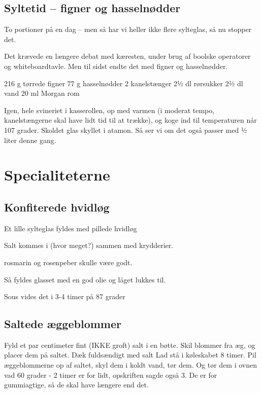 \documentclass[
  letterpaper,
  DIV=11,
  numbers=noendperiod]{scrreprt}
\begin{document}
\hypertarget{syltetid-figner-og-hasselnuxf8dder}{%
\section{Syltetid -- figner og
hasselnødder}\label{syltetid-figner-og-hasselnuxf8dder}}

To portioner på en dag -- men så har vi heller ikke flere sylteglas, så
nu stopper det.

Det krævede en længere debat med kæresten, under brug af boolske
operatorer og whiteboardtavle. Men til sidst endte det med figner og
hasselnødder.

216 g tørrede figner 77 g hasselnødder 2 kanelstænger 2½ dl rørsukker 2½
dl vand 20 ml Morgan rom

Igen, hele svineriet i kasserollen, op med varmen (i moderat tempo,
kanelstængerne skal have lidt tid til at trække), og koge ind til
temperaturen når 107 grader. Skoldet glas skyllet i atamon. Så ser vi om
det også passer med ½ liter denne gang.


\hypertarget{specialiteterne}{%
\chapter{Specialiteterne}\label{specialiteterne}}

\hypertarget{konfiterede-hvidluxf8g}{%
\section{Konfiterede hvidløg}\label{konfiterede-hvidluxf8g}}

Et lille sylteglas fyldes med pillede hvidløg

Salt kommes i (hvor meget?) sammen med krydderier.

rosmarin og rosenpeber skulle være godt.

Så fyldes glasset med en god olie og låget lukkes til.

Sous vides det i 3-4 timer på 87 grader

\hypertarget{saltede-uxe6ggeblommer}{%
\section{Saltede æggeblommer}\label{saltede-uxe6ggeblommer}}

Fyld et par centimeter fint (IKKE groft) salt i en bøtte. Skil blommer
fra æg, og placer dem på saltet. Dæk fuldsændigt med salt Lad stå i
køleskabet 8 timer. Pil æggeblommerne op af saltet, skyl dem i koldt
vand, tør dem. Og tør dem i ovnen vad 60 grader - 2 timer er for lidt,
opskriften sagde også 3. De er for gummiagtige, så de skal have længere
end det.
\end{document}
